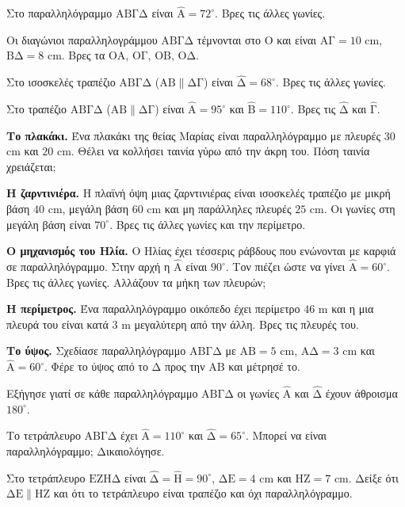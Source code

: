 \ex Στο παραλληλόγραμμο $\mathrm{ΑΒΓΔ}$ είναι $\hat{\mathrm{Α}}=72^\circ$. Βρες τις άλλες γωνίες.

\ex Οι διαγώνιοι παραλληλογράμμου $\mathrm{ΑΒΓΔ}$ τέμνονται στο $\mathrm{Ο}$ και είναι $\mathrm{ΑΓ}=10$ cm, $\mathrm{ΒΔ}=8$ cm. Βρες τα $\mathrm{ΟΑ}$, $\mathrm{ΟΓ}$, $\mathrm{ΟΒ}$, $\mathrm{ΟΔ}$.

\ex Στο ισοσκελές τραπέζιο $\mathrm{ΑΒΓΔ}$ ($\mathrm{ΑΒ}\parallel\mathrm{ΔΓ}$) είναι $\hat{\mathrm{Δ}}=68^\circ$. Βρες τις άλλες γωνίες.

\ex Στο τραπέζιο $\mathrm{ΑΒΓΔ}$ ($\mathrm{ΑΒ}\parallel\mathrm{ΔΓ}$) είναι $\hat{\mathrm{Α}}=95^\circ$ και $\hat{\mathrm{Β}}=110^\circ$. Βρες τις $\hat{\mathrm{Δ}}$ και $\hat{\mathrm{Γ}}$.


\ex \textbf{Το πλακάκι.} Ένα πλακάκι της θείας Μαρίας είναι παραλληλόγραμμο με πλευρές $30$ cm και $20$ cm. Θέλει να κολλήσει ταινία γύρω από την άκρη του. Πόση ταινία χρειάζεται;

\ex \textbf{Η ζαρντινιέρα.} Η πλαϊνή όψη μιας ζαρντινιέρας είναι ισοσκελές τραπέζιο με μικρή βάση $40$ cm, μεγάλη βάση $60$ cm και μη παράλληλες πλευρές $25$ cm. Οι γωνίες στη μεγάλη βάση είναι $70^\circ$. Βρες τις άλλες γωνίες και την περίμετρο.

\ex \textbf{Ο μηχανισμός του Ηλία.} Ο Ηλίας έχει τέσσερις ράβδους που ενώνονται με καρφιά σε παραλληλόγραμμο. Στην αρχή η $\hat{\mathrm{Α}}$ είναι $90^\circ$. Τον πιέζει ώστε να γίνει $\hat{\mathrm{Α}}=60^\circ$. Βρες τις άλλες γωνίες. Αλλάζουν τα μήκη των πλευρών;

\ex \textbf{Η περίμετρος.} Ένα παραλληλόγραμμο οικόπεδο έχει περίμετρο $46$ m και η μια πλευρά του είναι κατά $3$ m μεγαλύτερη από την άλλη. Βρες τις πλευρές του.

\ex \textbf{Το ύψος.} Σχεδίασε παραλληλόγραμμο $\mathrm{ΑΒΓΔ}$ με $\mathrm{ΑΒ}=5$ cm, $\mathrm{ΑΔ}=3$ cm και $\hat{\mathrm{Α}}=60^\circ$. Φέρε το ύψος από το $\mathrm{Δ}$ προς την $\mathrm{ΑΒ}$ και μέτρησέ το.


\ex Εξήγησε γιατί σε κάθε παραλληλόγραμμο $\mathrm{ΑΒΓΔ}$ οι γωνίες $\hat{\mathrm{Α}}$ και $\hat{\mathrm{Δ}}$ έχουν άθροισμα $180^\circ$.

\ex Το τετράπλευρο $\mathrm{ΑΒΓΔ}$ έχει $\hat{\mathrm{Α}}=110^\circ$ και $\hat{\mathrm{Δ}}=65^\circ$. Μπορεί να είναι παραλληλόγραμμο; Δικαιολόγησε.

\ex Στο τετράπλευρο $\mathrm{ΕΖΗΔ}$ είναι $\hat{\mathrm{Δ}}=\hat{\mathrm{Η}}=90^\circ$, $\mathrm{ΔΕ}=4$ cm και $\mathrm{ΗΖ}=7$ cm. Δείξε ότι $\mathrm{ΔΕ}\parallel\mathrm{ΗΖ}$ και ότι το τετράπλευρο είναι τραπέζιο και όχι παραλληλόγραμμο.

